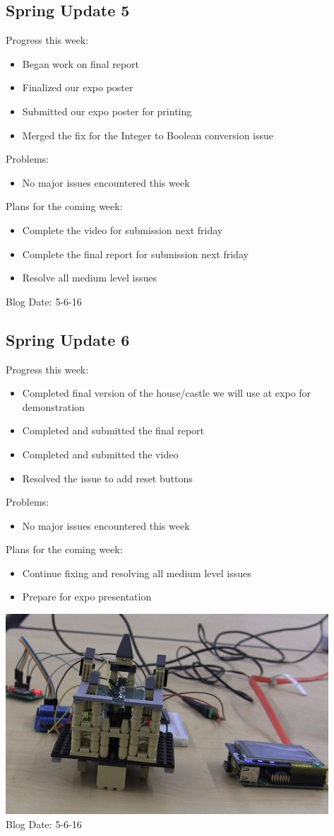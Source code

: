 \subsection{Spring Update 5}
Progress this week:
\begin{itemize}
\item Began work on final report
\item Finalized our expo poster
\item Submitted our expo poster for printing
\item Merged the fix for the Integer to Boolean conversion issue
\end{itemize}
Problems:
\begin{itemize}
\item No major issues encountered this week
\end{itemize}
Plans for the coming week: 
\begin{itemize}
\item Complete the video for submission next friday
\item Complete the final report for submission next friday
\item Resolve all medium level issues
\end{itemize}
Blog Date: 5-6-16

\subsection{Spring Update 6}
Progress this week:
\begin{itemize}
\item Completed final version of the house/castle we will use at expo for demonstration
\item Completed and submitted the final report
\item Completed and submitted the video
\item Resolved the issue to add reset buttons
\end{itemize}
Problems:
\begin{itemize}
\item No major issues encountered this week
\end{itemize}
Plans for the coming week: 
\begin{itemize}
\item Continue fixing and resolving all medium level issues
\item Prepare for expo presentation
\end{itemize}
\includegraphics{castle}\\
Blog Date: 5-6-16

